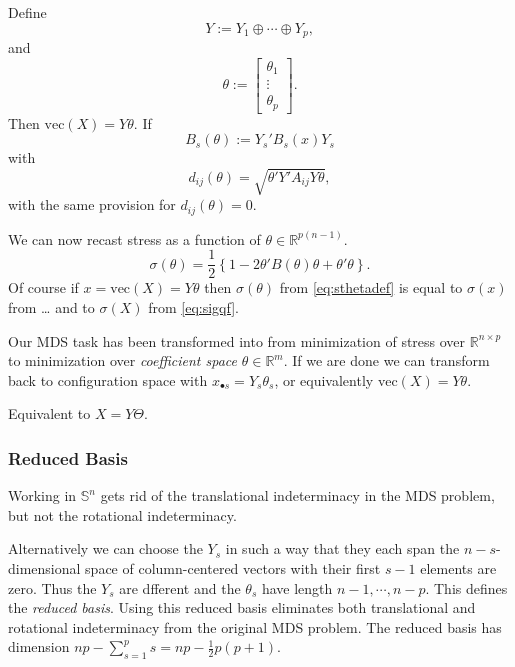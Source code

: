 \documentclass[
  12pt,
]{article}
\begin{document}
Define
\begin{equation}
Y:=Y_1\oplus\cdots\oplus Y_p,
\label{eq:ydef}
\end{equation}
and
\begin{equation}
\theta:=\begin{bmatrix}\theta_1\\\vdots\\\theta_p\end{bmatrix}.
\label{eq:thetadef}
\end{equation}
Then \(\text{vec}(X)=Y\theta\). If
\begin{equation}
B_s(\theta):=Y_s'B_s(x)Y_s
\label{eq:bthetadef}
\end{equation}
with
\begin{equation}
d_{ij}(\theta)=\sqrt{\theta'Y'A_{ij}Y\theta},
\label{eq:dthetadef}
\end{equation}
with the same provision for \(d_{ij}(\theta)=0\).

We can now recast stress as a function of \(\theta\in\mathbb{R}^{p(n-1)}\).
\begin{equation}
\sigma(\theta)=\frac12\left\{1-2\theta'B(\theta)\theta+\theta'\theta\right\}.
\label{eq:sthetadef}
\end{equation}
Of course if \(x=\text{vec}(X)=Y\theta\) then \(\sigma(\theta)\) from \eqref{eq:sthetadef} is equal to \(\sigma(x)\) from \ldots{} and to \(\sigma(X)\) from \eqref{eq:sigqf}.

Our MDS task has been transformed into from minimization of stress over \(\mathbb{R}^{n\times p}\) to minimization over \emph{coefficient space } \(\theta\in\mathbb{R}^m\). If we are done we can transform back to configuration space with \(x_{\bullet s}=Y_s\theta_s\), or equivalently \(\text{vec}(X)=Y\theta\).

Equivalent to \(X=Y\Theta\).

\subsubsection{Reduced Basis}\label{reduced-basis}

Working in \(\mathbb{S}^n\) gets rid of the translational indeterminacy in the MDS problem,
but not the rotational indeterminacy.

Alternatively we can choose the \(Y_s\) in such a way that they each span the \(n-s\)-dimensional space of column-centered vectors with their first \(s-1\) elements are zero. Thus the \(Y_s\) are dfferent
and the \(\theta_s\) have length \(n-1,\cdots,n-p\). This defines the \emph{reduced basis}. Using this reduced basis eliminates both translational and rotational indeterminacy from the original MDS problem. The reduced basis has dimension \(np-\sum_{s=1}^p s=np-\frac12p(p+1)\).
\end{document}
